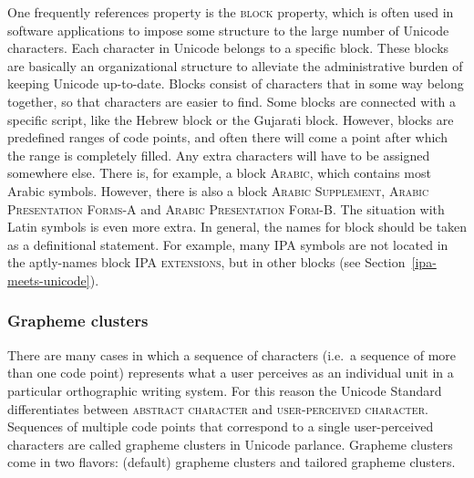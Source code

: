 One frequently references property is the \textsc{block} property, which is
often used in software applications to impose some structure to the large number
of Unicode characters. Each character in Unicode belongs to a specific block.
These blocks are basically an organizational structure to alleviate the
administrative burden of keeping Unicode up-to-date. Blocks consist of
characters that in some way belong together, so that characters are easier to
find. Some blocks are connected with a specific script, like the Hebrew block or
the Gujarati block. However, blocks are predefined ranges of code points, and
often there will come a point after which the range is completely filled. Any
extra characters will have to be assigned somewhere else. There is, for example,
a block \textsc{Arabic}, which contains most Arabic symbols. However, there is
also a block \textsc{Arabic Supplement}, \textsc{Arabic Presentation Forms-A}
and \textsc{Arabic Presentation Form-B}. The situation with Latin symbols is
even more extra. In general, the names for block should be taken as a
definitional statement. For example, many IPA symbols are not located in the
aptly-names block \textsc{IPA extensions}, but in other blocks (see Section~\ref{ipa-meets-unicode}).

\subsubsection*{Grapheme clusters}

There are many cases in which a sequence of characters (i.e.~a sequence of more
than one code point) represents what a user perceives as an individual unit in a
particular orthographic writing system. For this reason the Unicode Standard
differentiates between \textsc{abstract character} and \textsc{user-perceived
character}. Sequences of multiple code points that correspond to a single
user-perceived characters are called grapheme clusters in Unicode parlance.
Grapheme clusters come in two flavors: (default) grapheme clusters and tailored
grapheme clusters.


